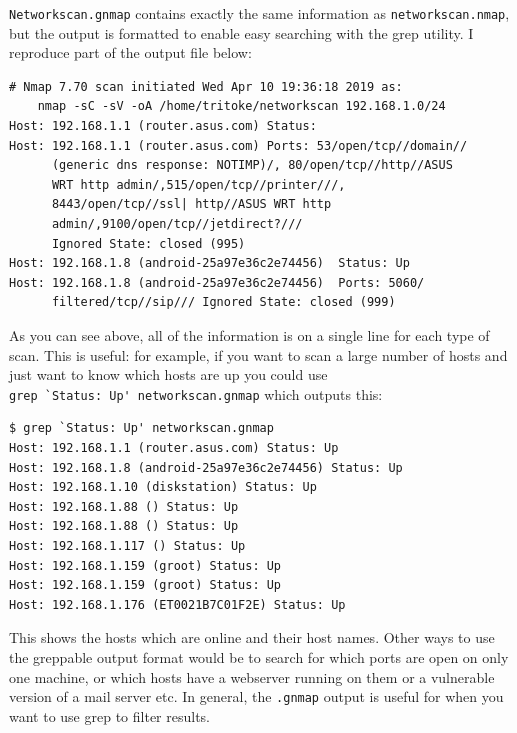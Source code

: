 \documentclass[titlepage]{article}
\begin{document}
\verb|Networkscan.gnmap| contains exactly the same information as \verb|networkscan.nmap|,
but the output is formatted to enable easy searching with the grep utility.
I reproduce part of the output file below:
\begin{verbatim}
# Nmap 7.70 scan initiated Wed Apr 10 19:36:18 2019 as:
    nmap -sC -sV -oA /home/tritoke/networkscan 192.168.1.0/24
Host: 192.168.1.1 (router.asus.com) Status:
Host: 192.168.1.1 (router.asus.com) Ports: 53/open/tcp//domain//
      (generic dns response: NOTIMP)/, 80/open/tcp//http//ASUS
      WRT http admin/,515/open/tcp//printer///,
      8443/open/tcp//ssl| http//ASUS WRT http
      admin/,9100/open/tcp//jetdirect?///
      Ignored State: closed (995)
Host: 192.168.1.8 (android-25a97e36c2e74456)  Status: Up
Host: 192.168.1.8 (android-25a97e36c2e74456)  Ports: 5060/
      filtered/tcp//sip/// Ignored State: closed (999)
\end{verbatim}
As you can see above, all of the information is on a single line for each type of scan.
This is useful: for example, if you want to scan a large number of hosts and just want
to know which hosts are up you could use \\
\verb|grep `Status: Up' networkscan.gnmap|
which outputs this:
\begin{verbatim}
$ grep `Status: Up' networkscan.gnmap
Host: 192.168.1.1 (router.asus.com) Status: Up
Host: 192.168.1.8 (android-25a97e36c2e74456) Status: Up
Host: 192.168.1.10 (diskstation) Status: Up
Host: 192.168.1.88 () Status: Up
Host: 192.168.1.88 () Status: Up
Host: 192.168.1.117 () Status: Up
Host: 192.168.1.159 (groot) Status: Up
Host: 192.168.1.159 (groot) Status: Up
Host: 192.168.1.176 (ET0021B7C01F2E) Status: Up
\end{verbatim}
This shows the hosts which are online and their host names. Other ways to use the greppable
output format would be to search for which ports are open on only one machine, or which hosts have a
webserver running on them or a vulnerable version of a mail server etc. In general, the \verb|.gnmap|
output is useful for when you want to use grep to filter results.
\end{document}

